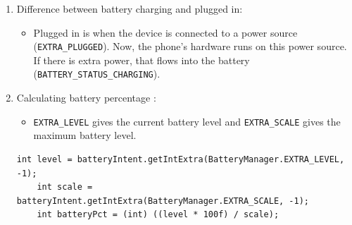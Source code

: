 \documentclass{article}
\begin{document}
\begin{enumerate}
\begin{itemize}
        \item Battery health : 
        \begin{itemize}
            \item \texttt{BATTERY\_HEALTH\_GOOD}
            \item \texttt{BATTERY\_HEALTH\_OVERHEAT}
            \item \texttt{BATTERY\_HEALTH\_DEAD}
            \item \texttt{BATTERY\_HEALTH\_OVER\_VOLTAGE}
            \item \texttt{BATTERY\_HEALTH\_UNSPECIFIED\_FAILURE}
        \end{itemize}

        \item \texttt{BATTERY\_CAPACITY\_LEVEL\_CRITICAL}, \texttt{BATTERY\_CAPACITY\_LEVEL\_LOW}, \texttt{BATTERY\_CAPACITY\_LEVEL\_NORMAL}, \texttt{BATTERY\_CAPACITY\_LEVEL\_FULL} and \texttt{BATTERY\_CAPACITY\_LEVEL\_UNKNOWN} \textbf{are only available from Android 16.}
    \end{itemize}

    \item Difference between battery charging and plugged in:
    \begin{itemize}
        \item Plugged in is when the device is connected to a power source (\texttt{EXTRA\_PLUGGED}). Now, the phone's hardware runs on this power source. If there is extra power, that flows into the battery (\texttt{BATTERY\_STATUS\_CHARGING}).
    \end{itemize}

    \item Calculating battery percentage \cite{Android_BatteryMonitoring}:
    \begin{itemize}
        \item \texttt{EXTRA\_LEVEL} gives the current battery level and \texttt{EXTRA\_SCALE} gives the maximum battery level.
    \end{itemize}

 \begin{lstlisting}[caption={Calculating Battery Percentage},label={label: Calculating Battery Percentage}]
    int level = batteryIntent.getIntExtra(BatteryManager.EXTRA_LEVEL, -1);
    int scale = batteryIntent.getIntExtra(BatteryManager.EXTRA_SCALE, -1);
    int batteryPct = (int) ((level * 100f) / scale);
 \end{lstlisting}

\end{enumerate}
\end{document}
